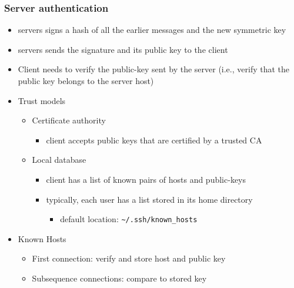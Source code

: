 \documentclass[final]{article}
\begin{document}
\subsubsection*{Server authentication}
\begin{itemize}[nosep]
    \item servers signs a hash of all the earlier messages and the new symmetric key
    \item servers sends the signature and its public key to the client
    \item Client needs to verify the public-key sent by the server (i.e., verify that the public key belongs to the server host)
    \item Trust models
          \begin{itemize}[nosep]
              \item Certificate authority
                    \begin{itemize}[nosep]
                        \item client accepts public keys that are certified by a trusted CA
                    \end{itemize}
              \item Local database
                    \begin{itemize}[nosep]
                        \item client has a list of known pairs of hosts and public-keys
                        \item typically, each user has a list stored in its home directory
                              \begin{itemize}[nosep]
                                  \item default location: \texttt{\~{}/.ssh/known\_hosts}
                              \end{itemize}
                    \end{itemize}
          \end{itemize}
    \item Known Hosts
          \begin{itemize}[nosep]
              \item First connection: verify and store host and public key
              \item Subsequence connections: compare to stored key
          \end{itemize}
\end{itemize}
\end{document}
